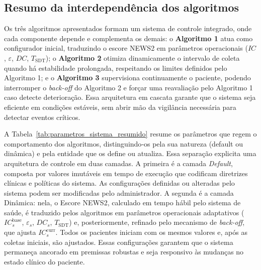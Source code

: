 \documentclass[twoside,english,brazilian]{UNISINOSmonografia}
\begin{document}
\subsection{Resumo da interdependência dos algoritmos}
Os três algoritmos apresentados formam um sistema de controle integrado, onde cada componente depende e complementa os demais: o \textbf{Algoritmo 1} atua como configurador inicial, traduzindo o escore NEWS2 em parâmetros operacionais ($IC$, $\varepsilon$, $DC$, $T_{\text{SDT}}$); o \textbf{Algoritmo 2} otimiza dinamicamente o intervalo de coleta quando há estabilidade prolongada, respeitando os limites definidos pelo Algoritmo 1; e o \textbf{Algoritmo 3} supervisiona continuamente o paciente, podendo interromper o \textit{back-off} do Algoritmo 2 e forçar uma reavaliação pelo Algoritmo 1 caso detecte deterioração. Essa arquitetura em cascata garante que o sistema seja eficiente em condições estáveis, sem abrir mão da vigilância necessária para detectar eventos críticos.

A Tabela~\ref{tab:parametros_sistema_resumido} resume os parâmetros que regem o comportamento dos algoritmos, distinguindo‐os pela sua natureza (default ou dinâmica) e pela entidade que os define ou atualiza. Essa separação explicita uma arquitetura de controle em duas camadas. A primeira é a camada \textit{Default}, composta por valores imutáveis em tempo de execução que codificam diretrizes clínicas e políticas do sistema. As configurações definidas ou alteradas pelo sistema podem ser modificadas pelo administrador. A segunda é a camada Dinâmica: nela, o Escore NEWS2, calculado em tempo hábil pelo sistema de saúde, é traduzido pelos algoritmos em parâmetros operacionais adaptativos ($IC^{\text{base}}_{s}$, $\varepsilon_{s}$, $DC_{s}$, $T_{\text{SDT}}$) e, posteriormente, refinado pelo mecanismo de \textit{back-off}, que ajusta $IC^{\text{curr}}_{s}$. Todos os pacientes iniciam com os mesmos valores e, após as coletas iniciais, são ajustados. Essas configurações garantem que o sistema permaneça ancorado em premissas robustas e seja responsivo às mudanças no estado clínico do paciente.
\end{document}
